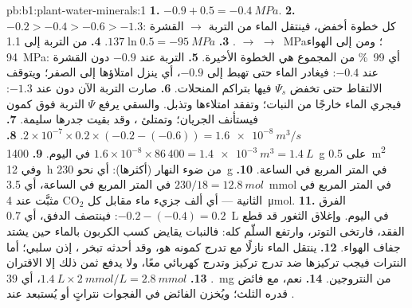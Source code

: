 \begin{solution}{pb:b1:plant-water-minerals:1}
\textbf{1.} $-0.9 + 0.5 = \qty{-0.4}{MPa}$.
\textbf{2.} $-0.2 > -0.4 > -0.6 > -1.3$: كل خطوة أخفض، فينتقل الماء
من التربة $\to$ القشرة $\to$  $\to$ .
\textbf{3.} $137\ln 0.5 = \qty{-95}{MPa}$.
\textbf{4.} من التربة إلى  \qty{1.1}{MPa}؛ ومن  إلى
الهواء \qty{94}{MPa}: أي \qty{99}{\%} من المجموع هي الخطوة الأخيرة.
\textbf{5.} التربة عند $-0.9$ دون  القشرة عند $-0.4$: فيغادر
الماء  حتى تهبط إلى $-0.9$، أي ينزل امتلاؤها إلى الصفر؛
ويتوقف الالتقاط حتى تخفض  $\Psi_s$ فيها بتراكم المنحلات.
\textbf{6.} صارت التربة الآن دون  عند $-1.3$: فيجري الماء
خارجًا من النبات؛ وتفقد  امتلاءها وتذبل. والسقي يرفع $\Psi$
التربة فوق كمون  فيستأنف الجريان؛ وتمتلئ ، وقد بقيت
جدرها سليمة.
\textbf{7.} $2\times 10^{-7}\times 0.2\times(-0.2 - (-0.6)) =
\qty{1.6e-8}{m^3/s}$.
\textbf{8.} $1.6\times 10^{-8}\times 86\,400 = \qty{1.4e-3}{m^3} =
\qty{1.4}{L}$ في اليوم.
\textbf{9.} \qty{1400}{g} على \qty{0.5}{m^2} وفي \qty{12}{h} من ضوء
النهار (أكثرها): أي نحو \qty{230}{g} في المتر المربع في الساعة.
\textbf{10.} $230/18 = \qty{12.8}{mol}$ في المتر المربع في الساعة، أي \qty{3.5}{mmol} في المتر المربع في الثانية --- أي ألف جزيء ماء مقابل كل $\mathrm{CO_2}$ مثبَّت عند \qty{4}{\micro mol}.
\textbf{11.} الفرق $-0.2 - (-0.4) = 0.2$: فينتصف الدفق، أي
\qty{0.7}{L} في اليوم. وإغلاق الثغور قد قطع الفقد، فارتخى التوتر،
وارتفع السلّم كله: فالنبات يقايض كسب الكربون بالماء حين يشتد جفاف
الهواء.
\textbf{12.} ينتقل الماء نازلًا مع تدرج كمونه هو، وقد أحدثه تبخر
،  إذن سلبي؛ أما النترات فيجب تركيزها ضد تدرج تركيز
وتدرج كهربائي معًا، ولا يدفع ثمن ذلك إلا الاقتران .
\textbf{13.} $\qty{1.4}{L}\times\qty{2}{mmol/L} = \qty{2.8}{mmol}$، أي
\qty{39}{mg} من النتروجين.
\textbf{14.} نعم، مع فائض قدره الثلث؛ ويُخزن الفائض في الفجوات
نتراتٍ أو يُستبعد عند .

\end{solution}

